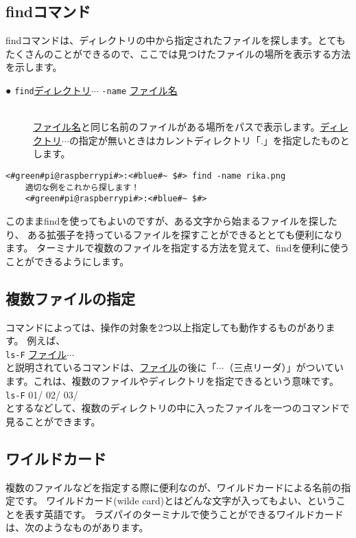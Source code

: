 \subsection{findコマンド}
findコマンドは、ディレクトリの中から指定されたファイルを探します。とてもたくさんのことができるので、ここでは見つけたファイルの場所を表示する方法を示します。

\begin{description}
    \item[● \texttt{find}\textvisiblespace \underline{ディレクトリ}$\cdots$ \texttt{-name} \underline{ファイル名} ]\mbox{}\\ 
    \underline{ファイル名}と同じ名前のファイルがある場所をパスで表示します。\underline{ディレクトリ}$\cdots$の指定が無いときはカレントディレクトリ「.」を指定したものとします。
\end{description}

\begin{lstlisting}[caption=ワイルドカードの使い方, label=wildcard]
    <#green#pi@raspberrypi#>:<#blue#~ $#> find -name rika.png
    適切な例をこれから探します！
    <#green#pi@raspberrypi#>:<#blue#~ $#>
\end{lstlisting}

このままfindを使ってもよいのですが、ある文字から始まるファイルを探したり、
ある拡張子を持っているファイルを探すことができるととても便利になります。
ターミナルで複数のファイルを指定する方法を覚えて、findを便利に使うことができるようにします。

\subsection{複数ファイルの指定}
コマンドによっては、操作の対象を2つ以上指定しても動作するものがあります。
例えば、\\
\texttt{ls}\textvisiblespace \texttt{-F} \underline{ファイル}$\cdots$\\
と説明されているコマンドは、\underline{ファイル}の後に「$\cdots$（三点リーダ）」がついています。これは、複数のファイルやディレクトリを指定できるという意味です。\\
\texttt{ls}\textvisiblespace \texttt{-F} 01/ 02/ 03/ \\
とするなどして、複数のディレクトリの中に入ったファイルを一つのコマンドで見ることができます。

\subsection{ワイルドカード}
複数のファイルなどを指定する際に便利なのが、ワイルドカードによる名前の指定です。
ワイルドカード(wilde card)とはどんな文字が入ってもよい、ということを表す英語です。
ラズパイのターミナルで使うことができるワイルドカードは、次のようなものがあります。

